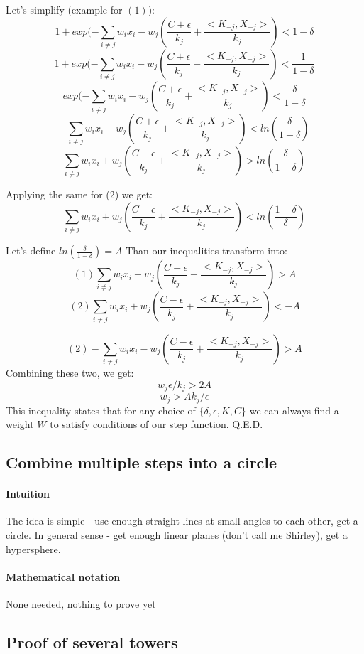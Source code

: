 \documentclass{article}
\begin{document}
Let's simplify (example for $(1)$):
$$1 + exp(- \sum_{i \neq j}w_ix_i - w_j (\frac{C + \epsilon}{k_j} + \frac{<K_{-j} , X_{-j}>}{k_j}) < 1-\delta$$
$$1 + exp(- \sum_{i \neq j}w_ix_i - w_j (\frac{C + \epsilon}{k_j} + \frac{<K_{-j} , X_{-j}>}{k_j}) < \frac{1}{1-\delta}$$
$$exp(- \sum_{i \neq j}w_ix_i - w_j (\frac{C + \epsilon}{k_j} + \frac{<K_{-j} , X_{-j}>}{k_j}) < \frac{\delta}{1-\delta}$$
$$- \sum_{i \neq j}w_ix_i - w_j (\frac{C + \epsilon}{k_j} + \frac{<K_{-j} , X_{-j}>}{k_j}) < ln(\frac{\delta}{1-\delta})$$
$$\sum_{i \neq j}w_ix_i + w_j (\frac{C + \epsilon}{k_j} + \frac{<K_{-j} , X_{-j}>}{k_j}) > ln(\frac{\delta}{1-\delta})$$

Applying the same for (2) we get:
$$\sum_{i \neq j}w_ix_i + w_j (\frac{C - \epsilon}{k_j} + \frac{<K_{-j} , X_{-j}>}{k_j}) < ln(\frac{1-\delta}{\delta})$$

Let's define $ln(\frac{\delta}{1-\delta}) = A$
Than our inequalities transform into:
$$(1)\sum_{i \neq j}w_ix_i + w_j (\frac{C + \epsilon}{k_j} + \frac{<K_{-j} , X_{-j}>}{k_j}) > A $$
$$(2)\sum_{i \neq j}w_ix_i + w_j (\frac{C - \epsilon}{k_j} + \frac{<K_{-j} , X_{-j}>}{k_j}) < -A $$

$$(2) - \sum_{i \neq j}w_ix_i - w_j (\frac{C - \epsilon}{k_j} + \frac{<K_{-j} , X_{-j}>}{k_j}) > A $$
Combining these two, we get:
$$ w_j\epsilon/k_j > 2A$$
$$ w_j > A k_j/\epsilon$$
This inequality states that for any choice of $\{\delta, \epsilon, K, C\}$ we can always find a weight $W$ to satisfy conditions of our step function.
Q.E.D.

\subsection{Combine multiple steps into a circle}
\paragraph{Intuition}
The idea is simple - use enough straight lines at small angles to each other, get a circle.
In general sense - get enough linear planes (don't call me Shirley), get a hypersphere.

\paragraph{Mathematical notation}
None needed, nothing to prove yet

\subsection{Proof of several towers}
\end{document}
